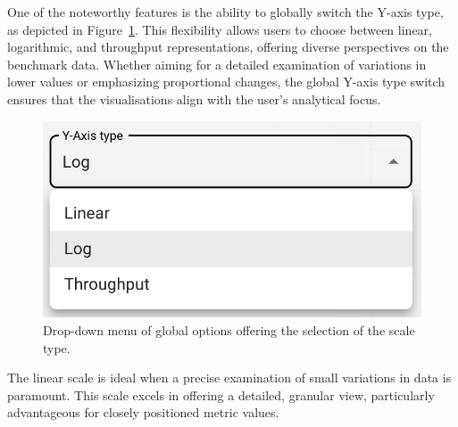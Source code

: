 One of the noteworthy features is the ability to globally switch the Y-axis type, as depicted in Figure~\ref{fig:chart-configuration-scale}. This flexibility allows users to choose between linear, logarithmic, and throughput representations, offering diverse perspectives on the benchmark data. Whether aiming for a detailed examination of variations in lower values or emphasizing proportional changes, the global Y-axis type switch ensures that the visualisations align with the user's analytical focus.

\begin{figure}[h]
  \centering
  \includegraphics[width=0.3\linewidth]{figures/chart-configuration-scale.png}
  \caption{Drop-down menu of global options offering the selection of the scale type.}
  \label{fig:chart-configuration-scale}
\end{figure}

The linear scale is ideal when a precise examination of small variations in data is paramount. This scale excels in offering a detailed, granular view, particularly advantageous for closely positioned metric values.

